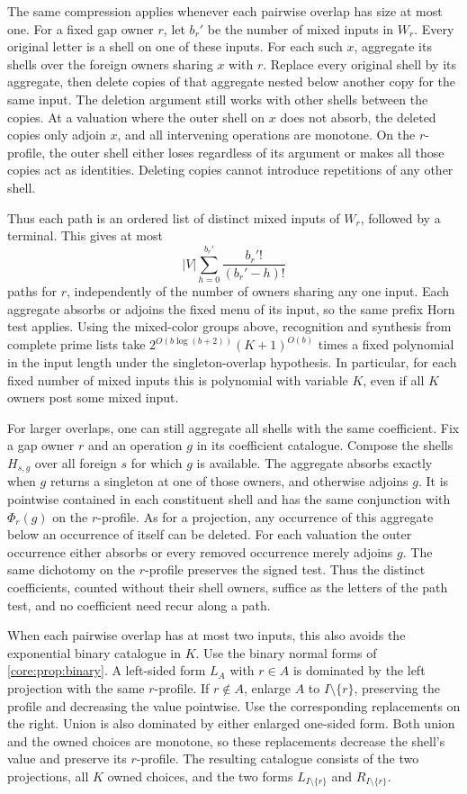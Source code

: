 The same compression applies whenever each pairwise overlap
has size at most one. For a fixed gap owner $r$, let $b_r'$
be the number of mixed inputs in $W_r$. Every original
letter is a shell on one of these inputs. For each such $x$,
aggregate its shells over the foreign owners sharing $x$
with $r$. Replace every original shell by its aggregate,
then delete copies of that aggregate nested below another
copy for the same input. The deletion argument still works
with other shells between the copies. At a valuation where
the outer shell on $x$ does not absorb, the deleted copies
only adjoin $x$, and all intervening operations are
monotone. On the $r$-profile, the outer shell either loses
regardless of its argument or makes all those copies act
as identities. Deleting copies cannot introduce repetitions
of any other shell.

Thus each path is an ordered list of distinct mixed inputs
of $W_r$, followed by a terminal. This gives at most
\[
                |V|\sum_{h=0}^{b_r'}\frac{b_r'!}{(b_r'-h)!}
\]
paths for $r$, independently of the number of owners sharing
any one input. Each aggregate absorbs or adjoins the fixed
menu of its input, so the same prefix Horn test applies.
Using the mixed-color groups above, recognition and
synthesis from complete prime lists take
$2^{O(b\log(b+2))}(K+1)^{O(b)}$ times a fixed polynomial
in the input length under the singleton-overlap hypothesis.
In particular, for each fixed number of mixed inputs this
is polynomial with variable $K$, even if all $K$ owners
post some mixed input.

For larger overlaps, one can still aggregate all shells
with the same coefficient. Fix a gap owner $r$ and an
operation $g$ in its coefficient catalogue. Compose
the shells $H_{s,g}$ over all foreign $s$ for which $g$
is available. The aggregate absorbs exactly when $g$
returns a singleton at one of those owners, and otherwise
adjoins $g$. It is pointwise contained in each constituent
shell and has the same conjunction with $\Phi_r(g)$ on
the $r$-profile. As for a projection, any occurrence of
this aggregate below an occurrence of itself can be
deleted. For each valuation the outer occurrence either
absorbs or every removed occurrence merely adjoins $g$.
The same dichotomy on the $r$-profile preserves the signed
test. Thus the distinct coefficients, counted without
their shell owners, suffice as the letters of the path
test, and no coefficient need recur along a path.

When each pairwise overlap has at most two inputs, this
also avoids the exponential binary catalogue in $K$.
Use the binary normal forms of \cref{core:prop:binary}.
A left-sided form $L_A$ with $r\in A$ is dominated by the
left projection with the same $r$-profile. If $r\notin A$,
enlarge $A$ to $I\setminus\{r\}$, preserving the profile
and decreasing the value pointwise. Use the corresponding
replacements on the right. Union is also dominated by
either enlarged one-sided form. Both union and the owned
choices are monotone, so these replacements decrease the
shell's value and preserve its $r$-profile. The resulting
catalogue consists of the two projections, all $K$ owned
choices, and the two forms $L_{I\setminus\{r\}}$ and
$R_{I\setminus\{r\}}$.

